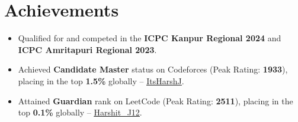 \documentclass[letterpaper,11pt]{article}
\newcommand{\resumeItem}[1]{
  \item\small{
    {#1}
  }
}
\newcommand{\resumeItemListStart}{\begin{itemize}[leftmargin=10pt, itemsep=3.5pt, parsep=0pt, topsep=2pt]}
\newcommand{\resumeItemListEnd}{\end{itemize}\vspace{-5pt}}
\begin{document}
\section{Achievements}
    \resumeItemListStart
        \resumeItem{Qualified for and competed in the \textbf{ICPC Kanpur Regional 2024} and \textbf{ICPC Amritapuri Regional 2023}.}
        \resumeItem{Achieved \textbf{Candidate Master} status on Codeforces (Peak Rating: \textbf{1933}), placing in the top \textbf{1.5\%} globally -- \href{https://codeforces.com/profile/ItsHarshJ}{\underline{ItsHarshJ}}.}
        \resumeItem{Attained \textbf{Guardian} rank on LeetCode (Peak Rating: \textbf{2511}), placing in the top \textbf{0.1\%} globally -- \href{https://leetcode.com/Harshit_J12}{\underline{Harshit\_J12}}.}
    \resumeItemListEnd
\end{document}
